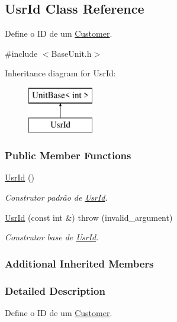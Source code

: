 \hypertarget{classUsrId}{\subsection{Usr\-Id Class Reference}
\label{d8/dc7/classUsrId}
}


Define o I\-D de um \hyperlink{classCustomer}{Customer}.  




{\ttfamily \#include $<$Base\-Unit.\-h$>$}

Inheritance diagram for Usr\-Id\-:\begin{figure}[H]
\begin{center}
\leavevmode
\includegraphics[height=2.000000cm]{d8/dc7/classUsrId}
\end{center}
\end{figure}
\subsubsection*{Public Member Functions}
\begin{DoxyCompactItemize}
\item 
\hyperlink{classUsrId_a55a05b8f951a218c66c49f09fa6ce374}{Usr\-Id} ()
\begin{DoxyCompactList}\small\item\em Construtor padrão de \hyperlink{classUsrId}{Usr\-Id}. \end{DoxyCompactList}\item 
\hyperlink{classUsrId_a3be81b6f539c0121803f9d88e9d89553}{Usr\-Id} (const int \&)  throw (invalid\-\_\-argument)
\begin{DoxyCompactList}\small\item\em Construtor base de \hyperlink{classUsrId}{Usr\-Id}. \end{DoxyCompactList}\end{DoxyCompactItemize}
\subsubsection*{Additional Inherited Members}


\subsubsection{Detailed Description}
Define o I\-D de um \hyperlink{classCustomer}{Customer}. 

